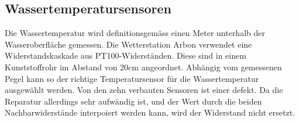 
\subsection{Wassertemperatursensoren}


Die Wassertemperatur wird definitionsgemäss einen Meter unterhalb der Wasseroberfläche gemessen. Die Wetterstation Arbon verwendet eine Widerstandskaskade aus PT100-Widerständen. Diese sind in einem Kunststoffrohr im Abstand von 20cm angeordnet. Abhängig vom gemessenen Pegel kann so der richtige Temperatursensor für die Wassertemperatur ausgewählt werden.
Von den zehn verbauten Sensoren ist einer defekt. Da die Reparatur allerdings sehr aufwändig ist, und der Wert durch die beiden Nachbarwiderstände interpoiert werden kann, wird der Widerstand nicht ersetzt.













